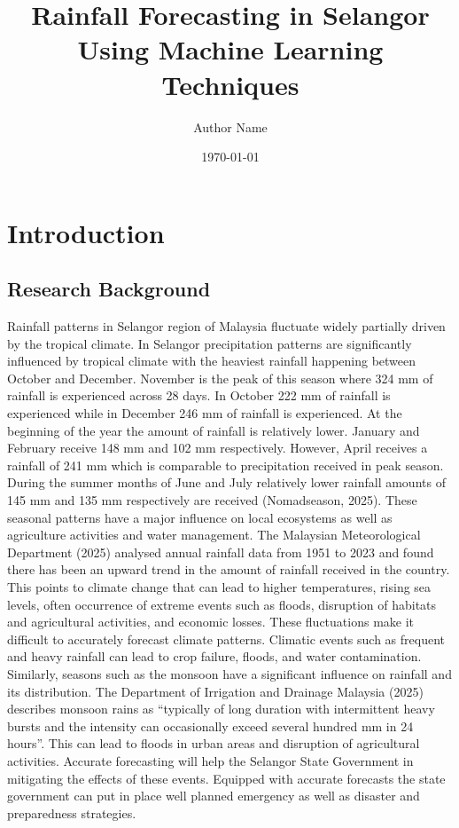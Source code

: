 \documentclass[12pt]{article}
\title{Rainfall Forecasting in Selangor Using Machine Learning Techniques}
\author{Author Name}
\date{\today}
\begin{document}
\chapter{Introduction}
\label{chap:introduction}

\section{Research Background}
\label{sec:research_background}
Rainfall patterns in Selangor region of Malaysia fluctuate widely partially driven by the tropical climate. In Selangor precipitation patterns are significantly influenced by tropical climate with the heaviest rainfall happening between October and December. November is the peak of this season where 324 mm of rainfall is experienced across 28 days. In October 222 mm of rainfall is experienced while in December 246 mm of rainfall is experienced. At the beginning of the year the amount of rainfall is relatively lower. January and February receive 148 mm and 102 mm respectively. However, April receives a rainfall of 241 mm which is comparable to precipitation received in peak season. During the summer months of June and July relatively lower rainfall amounts of 145 mm and 135 mm respectively are received (Nomadseason, 2025). These seasonal patterns have a major influence on local ecosystems as well as agriculture activities and water management. The Malaysian Meteorological Department (2025) analysed annual rainfall data from 1951 to 2023 and found there has been an upward trend in the amount of rainfall received in the country. This points to climate change that can lead to higher temperatures, rising sea levels, often occurrence of extreme events such as floods, disruption of habitats and agricultural activities, and economic losses. These fluctuations make it difficult to accurately forecast climate patterns. Climatic events such as frequent and heavy rainfall can lead to crop failure, floods, and water contamination. Similarly, seasons such as the monsoon have a significant influence on rainfall and its distribution. The Department of Irrigation and Drainage Malaysia (2025) describes monsoon rains as “typically of long duration with intermittent heavy bursts and the intensity can occasionally exceed several hundred mm in 24 hours”. This can lead to floods in urban areas and disruption of agricultural activities. Accurate forecasting will help the Selangor State Government in mitigating the effects of these events. Equipped with accurate forecasts the state government can put in place well planned emergency as well as disaster and preparedness strategies.
\end{document}
